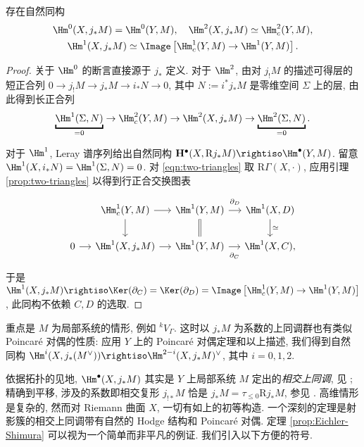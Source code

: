 \begin{proposition}\label{prop:parabolic-cohomology}
	存在自然同构
	\begin{gather*}
		\Hm^0(X, j_* M) = \Hm^0(Y, M), \quad \Hm^2(X, j_* M) \simeq \Hm_c^2(Y, M), \\
		\Hm^1(X, j_* M) \simeq \Image\left[ \Hm^1_c(Y, M) \to \Hm^1(Y, M) \right] .
	\end{gather*}
\end{proposition}
\begin{proof}
	关于 $\Hm^0$ 的断言直接源于 $j_*$ 定义. 对于 $\Hm^2$, 由对 $j_! M$ 的描述可得层的短正合列 $0 \to j_! M \to j_* M \to i_* N \to 0$, 其中 $N := i^* j_* M$ 是零维空间 $\Sigma$ 上的层, 由此得到长正合列
	\[ \underbracket{\Hm^1(\Sigma, N)}_{= 0} \to \Hm_c^2(Y, M) \to \Hm^2(X, j_* M) \to \underbracket{\Hm^2(\Sigma, N)}_{= 0}. \]

	对于 $\Hm^1$, Leray 谱序列给出自然同构 $\mathbf{H}^\bullet(X, \mathrm{R} j_* M) \rightiso \Hm^\bullet(Y, M)$. 留意 $\Hm^1(X, i_* N) = \Hm^1(\Sigma, N) = 0$. 对 \eqref{eqn:two-triangles} 取 $\mathrm{R}\Gamma(X, \cdot)$, 应用引理 \ref{prop:two-triangles} 以得到行正合交换图表
	\[\begin{tikzcd}[column sep=small]
		& \Hm^1_c(Y, M) \arrow[r] \arrow[d] & \Hm^1(Y, M) \arrow[r, "\partial_D" inner sep=0.2cm] \arrow[equal, d] & \Hm^1(X, D) \arrow[d, "\simeq"] \\
		0 \arrow [r] & \Hm^1(X, j_* M) \arrow[r] & \Hm^1(Y, M) \arrow[r, "\partial_C"' inner sep=0.2cm] & \Hm^1(X, C) ,
	\end{tikzcd}\]
	于是 $\Hm^1(X, j_* M) \rightiso \Ker(\partial_C) = \Ker(\partial_D) = \Image\left[ \Hm^1_c(Y, M) \to \Hm^1(Y, M) \right]$, 此同构不依赖 $C, D$ 的选取.
\end{proof}

重点是 $M$ 为局部系统的情形, 例如 ${}^k V_\Gamma$. 这时以 $j_* M$ 为系数的上同调群也有类似 Poincaré 对偶的性质: 应用 $Y$ 上的 Poincaré 对偶定理和以上描述, 我们得到自然同构 $\Hm^i(X, j_* (M^\vee)) \rightiso \Hm^{2-i}(X, j_* M)^\vee$, 其中 $i = 0, 1, 2$.

依据拓扑的见地, $\Hm^\bullet(X, j_* M)$ 其实是 $Y$ 上局部系统 $M$ 定出的\emph{相交上同调}, 见 \cite[\S 5.4]{Di04}; 精确到平移, 涉及的系数即相交复形 $j_{!*} M$ 恰是 $j_* M = \tau_{\leq 0} \mathrm{R} j_* M$, 参见 \cite[Exercise 5.2.11]{Di04}. 高维情形是复杂的, 然而对 Riemann 曲面 $X$, 一切有如上的初等构造. 一个深刻的定理是射影簇的相交上同调带有自然的 Hodge 结构和 Poincaré 对偶. 定理 \ref{prop:Eichler-Shimura} 可以视为一个简单而非平凡的例证. 我们引入以下方便的符号.

